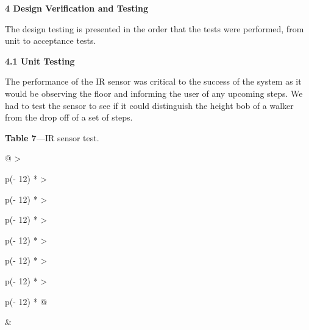 \textbf{4 Design Verification and Testing}


The design testing is presented in the order that the tests were
performed, from unit to acceptance tests.

\textbf{4.1 Unit Testing}

The performance of the IR sensor was critical to the success of the
system as it would be observing the floor and informing the user of any
upcoming steps. We had to test the sensor to see if it could distinguish
the height bob of a walker from the drop off of a set of steps.

\textbf{Table 7}---IR sensor test.

\begin{longtable}[]{@{}
  >{\raggedright\arraybackslash}p{(\columnwidth - 12\tabcolsep) * }
  >{\raggedright\arraybackslash}p{(\columnwidth - 12\tabcolsep) * }
  >{\raggedright\arraybackslash}p{(\columnwidth - 12\tabcolsep) * }
  >{\raggedright\arraybackslash}p{(\columnwidth - 12\tabcolsep) * }
  >{\raggedright\arraybackslash}p{(\columnwidth - 12\tabcolsep) * }
  >{\raggedright\arraybackslash}p{(\columnwidth - 12\tabcolsep) * }
  >{\raggedright\arraybackslash}p{(\columnwidth - 12\tabcolsep) * }@{}}
\toprule\noalign{}
 &
 \\
\midrule\noalign{}
\endhead
\bottomrule\noalign{}
\endlastfoot
{} \\
 \\
\end{longtable}
